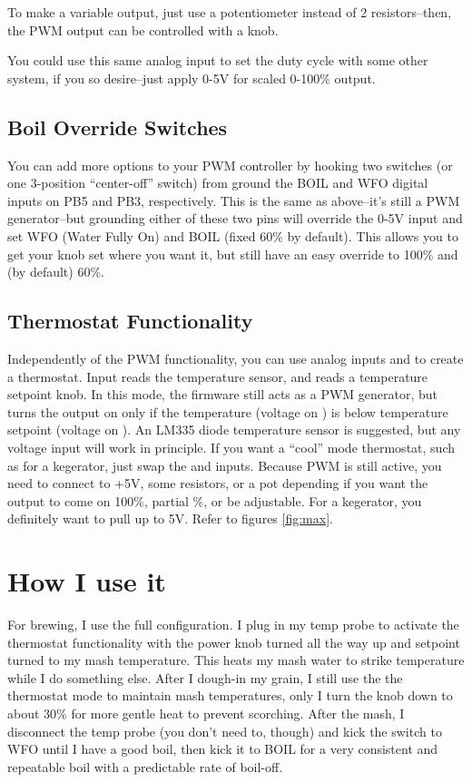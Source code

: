 \documentclass[dvips,12pt]{article}
\begin{document}
To make a variable output, just use a potentiometer instead of 2 resistors--then, the
PWM output can be controlled with a knob. 

You could use this same analog input to set the duty
cycle with some other system, if you so desire--just apply 0-5V for scaled 0-100\% output.

\subsection{Boil Override Switches} 
You can add more options to your PWM controller by hooking two switches (or one 3-position ``center-off'' switch) from ground the BOIL and WFO digital inputs on PB5 and PB3, respectively. This is the same as above--it's still a PWM generator--but grounding either of these two pins will override the 0-5V input and set WFO (Water Fully On) and BOIL (fixed 60\% by default). This allows you to get your knob set where you want it, but still have an easy override to 100\% and (by default) 60\%. 

\subsection{Thermostat Functionality} 
Independently of the PWM functionality, you can use analog inputs \probe{} and \temp{} to
create a thermostat. Input \probe{} reads the temperature sensor, and \temp{} reads a
temperature setpoint knob. In this mode, the firmware still acts as a PWM generator, but turns
the output on only if the temperature (voltage on \probe) is below temperature setpoint
(voltage on \temp). An LM335 diode temperature sensor is suggested, but any voltage input will
work in principle. If you want a ``cool'' mode thermostat, such as for a kegerator, just swap
the \temp{} and \probe{} inputs. Because PWM is still active, you need to connect \duty{} to
+5V, some resistors, or a pot depending if you want the output to come on 100\%, partial \%, or
be adjustable. For a kegerator, you definitely want to pull \duty{} up to 5V. Refer to figures \ref{fig:max}.

\section{How I use it}

For brewing, I use the full configuration. I plug in my temp probe to activate the thermostat
functionality with the power knob turned all the way up and setpoint turned to my mash
temperature. This heats my mash water to strike temperature while I do something else. After I
dough-in my grain, I still use the the thermostat mode to maintain mash temperatures, only I turn the knob down to about 30\% for more gentle heat to prevent scorching. After the mash, I disconnect the temp probe (you don't need to, though) and kick the switch to WFO until I have a good boil, then kick it to BOIL for a very consistent and repeatable boil with a predictable rate of boil-off. 
\end{document}

